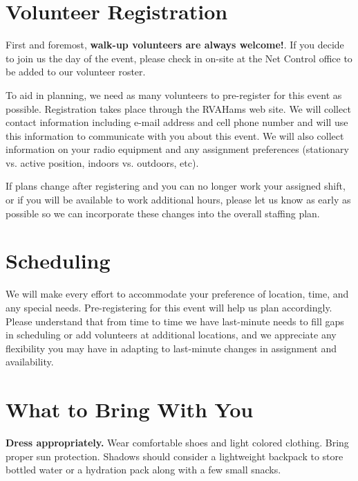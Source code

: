 \documentclass[pdflatex,letterpaper,twoside,12pt]{book}
\begin{document}
\section{Volunteer Registration}

First and foremost, \textbf{walk-up volunteers are always welcome!}.  If you decide to join us the day of the event, please check in on-site at the Net Control office to be added to our volunteer roster.

To aid in planning, we need as many volunteers to pre-register for this event as possible.  Registration takes place through the RVAHams web site.  We will collect contact information including e-mail address and cell phone number and will use this information to communicate with you about this event.  We will also collect information on your radio equipment and any assignment preferences (stationary vs. active position, indoors vs. outdoors, etc).

If plans change after registering and you can no longer work your assigned shift, or if you will be available to work additional hours, please let us know as early as possible so we can incorporate these changes into the overall staffing plan.


\section{Scheduling}

We will make every effort to accommodate your preference of location, time, and any special needs.  Pre-registering for this event will help us plan accordingly.  Please understand that from time to time we have last-minute needs to fill gaps in scheduling or add volunteers at additional locations, and we appreciate any flexibility you may have in adapting to last-minute changes in assignment and availability.


\section{What to Bring With You}

\textbf{Dress appropriately.}  Wear comfortable shoes and light colored clothing.  Bring proper sun protection.  Shadows should consider a lightweight backpack to store bottled water or a hydration pack along with a few small snacks.
\end{document}

